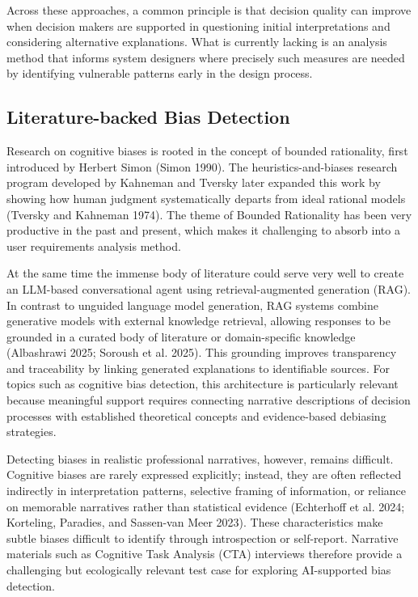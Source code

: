 \documentclass[
  manuscript,
  anonymous,
  review]{acmart}
\begin{document}
Across these approaches, a common principle is that decision quality can
improve when decision makers are supported in questioning initial
interpretations and considering alternative explanations. What is
currently lacking is an analysis method that informs system designers
where precisely such measures are needed by identifying vulnerable
patterns early in the design process.

\subsection{Literature-backed Bias
Detection}\label{literature-backed-bias-detection}

Research on cognitive biases is rooted in the concept of bounded
rationality, first introduced by Herbert Simon (Simon 1990). The
heuristics-and-biases research program developed by Kahneman and Tversky
later expanded this work by showing how human judgment systematically
departs from ideal rational models (Tversky and Kahneman 1974). The
theme of Bounded Rationality has been very productive in the past and
present, which makes it challenging to absorb into a user requirements
analysis method.

At the same time the immense body of literature could serve very well to
create an LLM-based conversational agent using retrieval-augmented
generation (RAG). In contrast to unguided language model generation, RAG
systems combine generative models with external knowledge retrieval,
allowing responses to be grounded in a curated body of literature or
domain-specific knowledge (Albashrawi 2025; Soroush et al. 2025). This
grounding improves transparency and traceability by linking generated
explanations to identifiable sources. For topics such as cognitive bias
detection, this architecture is particularly relevant because meaningful
support requires connecting narrative descriptions of decision processes
with established theoretical concepts and evidence-based debiasing
strategies.

Detecting biases in realistic professional narratives, however, remains
difficult. Cognitive biases are rarely expressed explicitly; instead,
they are often reflected indirectly in interpretation patterns,
selective framing of information, or reliance on memorable narratives
rather than statistical evidence (Echterhoff et al. 2024; Korteling,
Paradies, and Sassen-van Meer 2023). These characteristics make subtle
biases difficult to identify through introspection or self-report.
Narrative materials such as Cognitive Task Analysis (CTA) interviews
therefore provide a challenging but ecologically relevant test case for
exploring AI-supported bias detection.
\end{document}
